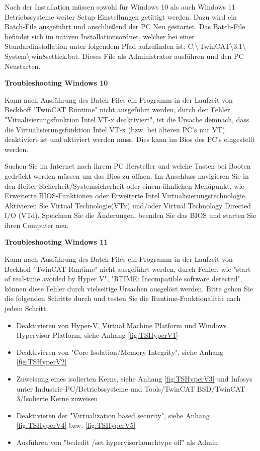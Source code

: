 Nach der Installation müssen sowohl für Windows 10 als auch Windows 11 Betriebssysteme weiter Setup Einstellungen getätigt werden. Dazu wird ein Batch-File ausgeführt und anschließend der PC Neu gestartet. Das Batch-File befindet sich im nativen Installationsordner, welcher bei einer Standardinstallation unter folgendem Pfad aufzufinden ist: C:\textbackslash\,TwinCAT\textbackslash3.1\textbackslash\,System\textbackslash\,win8settick.bat. Dieses File als Administrator ausführen und den PC Neustarten.

\textbf{Troubleshooting Windows 10}

Kann nach Ausführung des Batch-Files ein Programm in der Laufzeit von Beckhoff "TwinCAT Runtime" nicht ausgeführt werden, durch den Fehler "Vitualisierungsfunktion Intel VT-x deaktiviert", ist die Ursache demnach, dass die Virtualisierungsfunktion Intel VT-x (bzw. bei älteren PC's nur VT) deaktiviert ist und aktiviert werden muss. Dies kann im Bios des PC's eingestellt werden. 

Suchen Sie im Internet nach ihrem PC Hersteller und welche Tasten bei Booten gedrückt werden müssen um das Bios zu öffnen. Im Anschluss navigieren Sie in den Reiter Sicherheit/Systemsicherheit oder einem ähnlichen Menüpunkt, wie Erweiterte BIOS-Funktionen oder Erweiterte Intel Virtualisierungstechnologie. Aktivieren Sie Virtual Technologie(VTx) und/oder Virtual Technology Directed I/O (VTd). 
Speichern Sie die Änderungen, beenden Sie das BIOS und starten Sie ihren Computer neu. 

\textbf{Troubleshooting Windows 11}

Kann nach Ausführung des Batch-Files ein Programm in der Laufzeit von Beckhoff "TwinCAT Runtime" nicht ausgeführt werden, durch Fehler, wie "start of real-time avoided by Hyper V", "RTIME: Incompatible software detected", können diese Fehler durch vielseitige Ursachen ausgelöst werden. Bitte gehen Sie die folgenden Schritte durch und testen Sie die Runtime-Funktionalität nach jedem Schritt. 
  
  \begin{itemize}
  	\item Deaktivieren von Hyper-V, Virtual Machine Platform und Windows Hypervisor Platform, siehe Anhang \ref{fig:TSHyperV1}
  	\item Deaktivieren von "Core Isolation/Memory Integrity", siehe Anhang \ref{fig:TSHyperV2}
  	\item Zuweisung eines isolierten Kerns, siehe Anhang \ref{fig:TSHyperV3} und Infosys unter Industrie-PC/Betriebssysteme und Tools/TwinCAT BSD/TwinCAT 3/Isolierte Kerne zuweisen
  	\item Deaktivieren der "Virtualization based security", siehe Anhang \ref{fig:TSHyperV4} bzw. \ref{fig:TSHyperV5}
  	\item Ausführen von "bcdedit /set hypervisorlaunchtype off" als Admin
  \end{itemize}


 
\newpage
